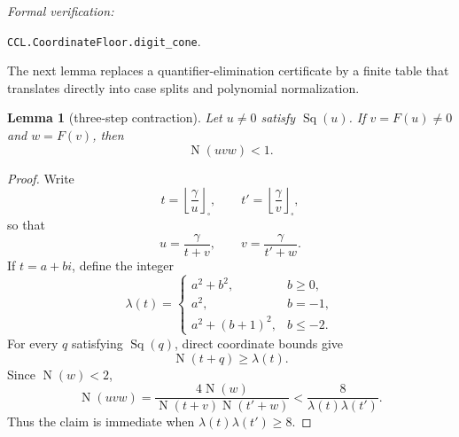 \documentclass[10pt]{article}
\newtheorem{lemma}[theorem]{Lemma}
\theoremstyle{definition}
\theoremstyle{remark}
\newcommand{\Norm}{\operatorname{N}}
\newcommand{\sqfloor}[1]{\left\lfloor #1\right\rfloor_{\!\square}}
\newcommand{\leanref}[1]{\par\smallskip\noindent
  \emph{Formal verification:}\par\nobreak
  {\raggedright\nolinkurl{#1}.\par}}
\begin{document}
\leanref{CCL.CoordinateFloor.digit_cone}

The next lemma replaces a quantifier-elimination certificate by a finite table that translates directly into case splits and polynomial normalization.

\begin{lemma}[three-step contraction]\label{lem:ccf-contraction}
Let $u\ne0$ satisfy $\operatorname{Sq}(u)$.  If $v=F(u)\ne0$ and $w=F(v)$, then
\[
 \Norm(uvw)<1.
\]
\end{lemma}

\begin{proof}
Write
\[
 t=\sqfloor{\frac\gamma u},\qquad
 t'=\sqfloor{\frac\gamma v},
\]
so that
\[
 u=\frac\gamma{t+v},\qquad
 v=\frac\gamma{t'+w}.
\]
If $t=a+bi$, define the integer
\[
 \lambda(t)=
 \begin{cases}
 a^2+b^2,&b\ge0,\\
 a^2,&b=-1,\\
 a^2+(b+1)^2,&b\le-2.
 \end{cases}
\]
For every $q$ satisfying $\operatorname{Sq}(q)$, direct coordinate bounds give
\[
 \Norm(t+q)\ge\lambda(t).
\]
Since $\Norm(w)<2$,
\[
 \Norm(uvw)
 =\frac{4\Norm(w)}{\Norm(t+v)\Norm(t'+w)}
 <\frac8{\lambda(t)\lambda(t')}.
\]
Thus the claim is immediate when $\lambda(t)\lambda(t')\ge8$.


\end{proof}
\end{document}
